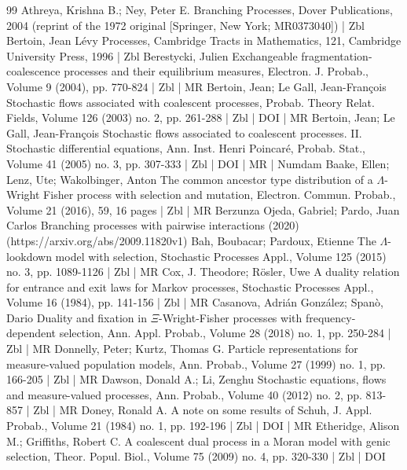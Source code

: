 \begin{thebibliography}{99}
 Athreya, Krishna B.; Ney, Peter E. Branching Processes, Dover Publications, 2004 (reprint of the 1972 original [Springer, New York; MR0373040]) | Zbl
 Bertoin, Jean Lévy Processes, Cambridge Tracts in Mathematics, 121, Cambridge University Press, 1996 | Zbl
 Berestycki, Julien Exchangeable fragmentation-coalescence processes and their equilibrium measures, Electron. J. Probab., Volume 9 (2004), pp. 770-824 | Zbl | MR
 Bertoin, Jean; Le Gall, Jean-François Stochastic flows associated with coalescent processes, Probab. Theory Relat. Fields, Volume 126 (2003) no. 2, pp. 261-288 | Zbl | DOI | MR
 Bertoin, Jean; Le Gall, Jean-François Stochastic flows associated to coalescent processes. II. Stochastic differential equations, Ann. Inst. Henri Poincaré, Probab. Stat., Volume 41 (2005) no. 3, pp. 307-333 | Zbl | DOI | MR | Numdam
 Baake, Ellen; Lenz, Ute; Wakolbinger, Anton The common ancestor type distribution of a $\Lambda $-Wright Fisher process with selection and mutation, Electron. Commun. Probab., Volume 21 (2016), 59, 16 pages | Zbl | MR
 Berzunza Ojeda, Gabriel; Pardo, Juan Carlos Branching processes with pairwise interactions (2020) (https://arxiv.org/abs/2009.11820v1)
 Bah, Boubacar; Pardoux, Etienne The $\Lambda $-lookdown model with selection, Stochastic Processes Appl., Volume 125 (2015) no. 3, pp. 1089-1126 | Zbl | MR
 Cox, J. Theodore; Rösler, Uwe A duality relation for entrance and exit laws for Markov processes, Stochastic Processes Appl., Volume 16 (1984), pp. 141-156 | Zbl | MR
 Casanova, Adrián González; Spanò, Dario Duality and fixation in $\Xi $-Wright-Fisher processes with frequency-dependent selection, Ann. Appl. Probab., Volume 28 (2018) no. 1, pp. 250-284 | Zbl | MR
 Donnelly, Peter; Kurtz, Thomas G. Particle representations for measure-valued population models, Ann. Probab., Volume 27 (1999) no. 1, pp. 166-205 | Zbl | MR
 Dawson, Donald A.; Li, Zenghu Stochastic equations, flows and measure-valued processes, Ann. Probab., Volume 40 (2012) no. 2, pp. 813-857 | Zbl | MR
 Doney, Ronald A. A note on some results of Schuh, J. Appl. Probab., Volume 21 (1984) no. 1, pp. 192-196 | Zbl | DOI | MR
 Etheridge, Alison M.; Griffiths, Robert C. A coalescent dual process in a Moran model with genic selection, Theor. Popul. Biol., Volume 75 (2009) no. 4, pp. 320-330 | Zbl | DOI

\end{thebibliography}
